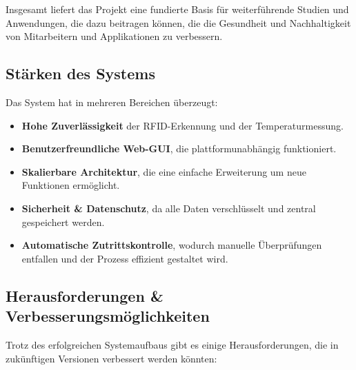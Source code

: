 \vspace{1em}
\noindent Insgesamt liefert das Projekt eine fundierte Basis für weiterführende Studien und Anwendungen, die dazu beitragen können, die die Gesundheit und Nachhaltigkeit von Mitarbeitern und Applikationen zu verbessern.

\subsection{Stärken des Systems}

Das System hat in mehreren Bereichen überzeugt:

\begin{itemize}
    \item \textbf{Hohe Zuverlässigkeit} der RFID-Erkennung und der Temperaturmessung.
    \item \textbf{Benutzerfreundliche Web-GUI}, die plattformunabhängig funktioniert.
    \item \textbf{Skalierbare Architektur}, die eine einfache Erweiterung um neue Funktionen ermöglicht.
    \item \textbf{Sicherheit \& Datenschutz}, da alle Daten verschlüsselt und zentral gespeichert werden.
    \item \textbf{Automatische Zutrittskontrolle}, wodurch manuelle Überprüfungen entfallen und der Prozess effizient gestaltet wird.
\end{itemize}

\subsection{Herausforderungen \& Verbesserungsmöglichkeiten}

Trotz des erfolgreichen Systemaufbaus gibt es einige Herausforderungen, die in zukünftigen Versionen verbessert werden könnten:


